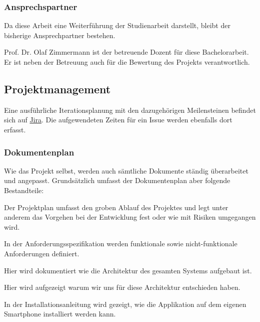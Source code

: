 \subsubsection*{Ansprechspartner}
Da diese Arbeit eine Weiterführung der Studienarbeit darstellt, bleibt der bisherige Ansprechpartner bestehen.

\begin{description}[leftmargin=!,labelwidth=\widthof{\bfseries Betreuer}]
	\item[Betreuer] Prof. Dr. Olaf Zimmermann ist der betreuende Dozent für diese Bachelorarbeit. Er ist neben der Betreuung auch für die Bewertung des Projekts verantwortlich. 
\end{description}

\subsection{Projektmanagement}
Eine ausführliche Iterationsplanung mit den dazugehörigen Meilensteinen befindet sich auf \href{https://hsr-ba.atlassian.net/}{Jira}. Die aufgewendeten Zeiten für ein Issue werden ebenfalls dort erfasst.



\subsubsection*{Dokumentenplan}
Wie das Projekt selbst, werden auch sämtliche Dokumente ständig überarbeitet und angepasst. Grundsätzlich umfasst der Dokumentenplan aber folgende Bestandteile:

\begin{description}[leftmargin=!,labelwidth=\widthof{\bfseries Architekturdokumentation}]
	\item[Projektplan] Der Projektplan umfasst den groben Ablauf des Projektes und legt unter anderem das Vorgehen bei der Entwicklung fest oder wie mit Risiken umgegangen wird.
	\item[Anforderungsspezifikation] In der Anforderungsspezifikation werden funktionale sowie nicht-funktionale Anforderungen definiert.
	\item[Architekturdokumentation] Hier wird dokumentiert wie die Architektur des gesamten Systems aufgebaut ist.
	\item[Architekturentscheide] Hier wird aufgezeigt warum wir uns für diese Architektur entschieden haben.
	\item[Installationsanleitung] In der Installationsanleitung wird gezeigt, wie die Applikation auf dem eigenen Smartphone installiert werden kann.
\end{description}
 

